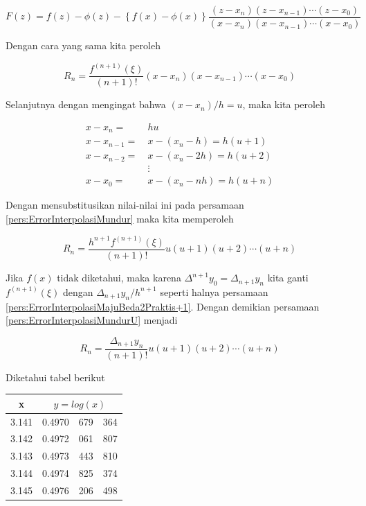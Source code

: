 \begin{equation}
F(z) = f(z) - \phi(z) - \left\{f(x)-\phi(x)\right\}\frac{(z-x_n)(z-x_{n-1})\cdots(z-x_0)}{(x-x_n)(x-x_{n-1})\cdots(x-x_0)}
\end{equation}

Dengan cara yang sama kita peroleh

\begin{equation}\label{pers:ErrorInterpolasiMundur}
R_n = \frac{f^{(n+1)}(\xi)}{(n+1)!}(x-x_n)(x-x_{n-1})\cdots(x-x_0)
\end{equation}

Selanjutnya dengan mengingat bahwa $(x-x_n)/h = u$, maka kita peroleh

\begin{equation*}
\begin{split}
x - x_n =~& hu\\
x - x_{n-1} =~& x-(x_n-h) = h(u+1)\\
x - x_{n-2} =~& x-(x_n-2h) = h(u+2)\\
&\vdots\\
x - x_0 =~& x-(x_n-nh) = h(u+n)
\end{split}
\end{equation*}

Dengan mensubstitusikan nilai-nilai ini pada persamaan \ref{pers:ErrorInterpolasiMundur} maka kita memperoleh

\begin{equation}\label{pers:ErrorInterpolasiMundurU}
R_n = \frac{h^{n+1}f^{(n+1)}(\xi)}{(n+1)!}u(u+1)(u+2)\cdots(u+n)
\end{equation}

Jika $f(x)$ tidak diketahui, maka karena $\Delta^{n+1} y_0 = \Delta_{n+1} y_n$ kita ganti $f^{(n+1)}(\xi)$ dengan $\Delta_{n+1} y_n / h^{n+1}$ seperti halnya persamaan \ref{pers:ErrorInterpolasiMajuBeda2Praktis+1}. Dengan demikian persamaan \ref{pers:ErrorInterpolasiMundurU} menjadi

\begin{equation}
R_n = \frac{\Delta_{n+1} y_n}{(n+1)!}u(u+1)(u+2)\cdots(u+n)
\end{equation}

\begin{exmp}\end{exmp}
Diketahui tabel berikut

\begin{table}[!htbp]
\centering
\begin{tabular}{@{}|c|*3c|@{}}
\hline
\multicolumn{1}{|c|}{\bf{x}} & \multicolumn{3}{c|}{\bf{$y = log(x)$}}\\
\hline
3.141 & 0.4970 & 679 & 364\\
3.142 & 0.4972 & 061 & 807\\
3.143 & 0.4973 & 443 & 810\\
3.144 & 0.4974 & 825 & 374\\
3.145 & 0.4976 & 206 & 498\\
\hline
\end{tabular}
\end{table}


